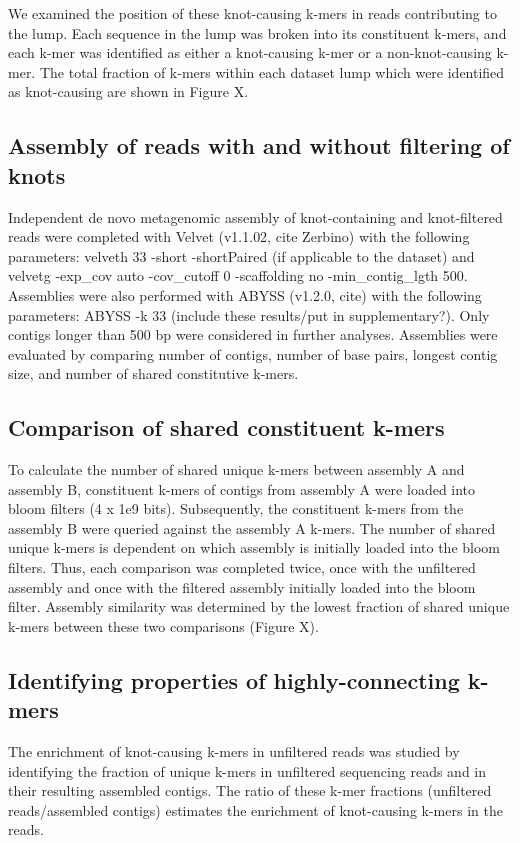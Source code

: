 \documentclass[11pt]{article} %
\begin{document}
We examined the position of these knot-causing k-mers in reads contributing
to the lump. Each sequence in the lump was broken into its constituent
k-mers, and each k-mer was identified as either a knot-causing k-mer or a non-knot-causing k-mer. The total fraction of k-mers within each dataset lump which were identified
as knot-causing are shown in Figure X. 

\subsection{Assembly of reads with and without filtering of knots}
Independent de novo metagenomic assembly of knot-containing and knot-filtered reads
were completed with Velvet (v1.1.02, cite Zerbino) with the following
parameters: velveth 33 -short -shortPaired (if applicable to the dataset)
and velvetg -exp\_cov auto -cov\_cutoff 0 -scaffolding no -min\_contig\_lgth
500. Assemblies were also performed with ABYSS (v1.2.0, cite) with
the following parameters: ABYSS -k 33 (include these results/put in
supplementary?). Only contigs longer than 500 bp were considered in
further analyses. Assemblies were evaluated by comparing number of
contigs, number of base pairs, longest contig size, and number of
shared constitutive k-mers. 

\subsection{Comparison of shared constituent k-mers}

To calculate the number of shared unique k-mers between assembly A and assembly B, constituent k-mers of contigs from assembly A were loaded into bloom filters (4 x 1e9 bits). Subsequently, the constituent k-mers from the assembly B were queried against
the assembly A k-mers. The number of shared unique k-mers is
dependent on which assembly is initially loaded into the bloom filters. Thus, each comparison was completed twice, once with the unfiltered
assembly and once with the filtered assembly initially loaded into the bloom
filter. Assembly similarity was determined by the lowest fraction
of shared unique k-mers between these two comparisons (Figure X). 

\subsection{Identifying properties of highly-connecting k-mers}
The enrichment of knot-causing k-mers in unfiltered reads was studied
by identifying the fraction of unique k-mers in unfiltered sequencing
reads and in their resulting assembled contigs. The ratio of these k-mer fractions (unfiltered reads/assembled contigs) estimates the enrichment of knot-causing k-mers in the reads. 
\end{document}
